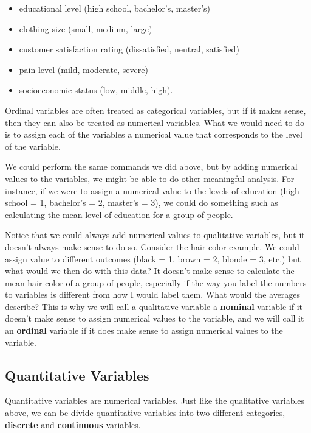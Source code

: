 \documentclass[
  letterpaper,
  DIV=11,
  numbers=noendperiod]{scrreprt}
\providecommand{\tightlist}{%
  \setlength{\itemsep}{0pt}\setlength{\parskip}{0pt}}\usepackage{longtable,booktabs,array}
\begin{document}
\begin{itemize}
\tightlist
\item
  educational level (high school, bachelor's, master's)
\item
  clothing size (small, medium, large)
\item
  customer satisfaction rating (dissatisfied, neutral, satisfied)
\item
  pain level (mild, moderate, severe)
\item
  socioeconomic status (low, middle, high).
\end{itemize}

Ordinal variables are often treated as categorical variables, but if it
makes sense, then they can also be treated as numerical variables. What
we would need to do is to assign each of the variables a numerical value
that corresponds to the level of the variable.

We could perform the same commands we did above, but by adding numerical
values to the variables, we might be able to do other meaningful
analysis. For instance, if we were to assign a numerical value to the
levels of education (high school = 1, bachelor's = 2, master's = 3), we
could do something such as calculating the mean level of education for a
group of people.

Notice that we could always add numerical values to qualitative
variables, but it doesn't always make sense to do so. Consider the hair
color example. We could assign value to different outcomes (black = 1,
brown = 2, blonde = 3, etc.) but what would we then do with this data?
It doesn't make sense to calculate the mean hair color of a group of
people, especially if the way you label the numbers to variables is
different from how I would label them. What would the averages describe?
This is why we will call a qualitative variable a \textbf{nominal}
variable if it doesn't make sense to assign numerical values to the
variable, and we will call it an \textbf{ordinal} variable if it does
make sense to assign numerical values to the variable.

\subsection*{Quantitative Variables}\label{quantitative-variables}

Quantitative variables are numerical variables. Just like the
qualitative variables above, we can be divide quantitative variables
into two different categories, \textbf{discrete} and \textbf{continuous}
variables.
\end{document}
